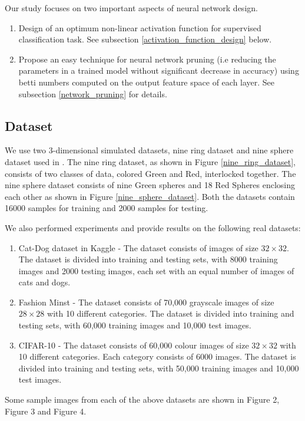 \documentclass{bmvc2k}
\begin{document}
Our study focuses on two important aspects of neural network design.
\begin{enumerate}
\item Design of an optimum non-linear activation function for supervised classification task. See subsection \ref{activation_function_design}  below.
\item Propose an easy technique for neural network pruning (i.e reducing the parameters in a trained model without significant decrease in accuracy) using betti numbers computed on the output feature space of each layer. See subsection \ref{network_pruning} for details.
\end{enumerate}
\subsection{Dataset}
We use two $3$-dimensional simulated datasets, nine ring dataset and nine sphere dataset used in \cite{naitzat2020topology}. The  nine ring dataset, as shown in Figure \ref{nine_ring_dataset},  consists of two classes of data,  colored Green and Red, interlocked together. The nine sphere dataset consists of nine Green spheres and 18 Red Spheres enclosing each other as shown in Figure \ref{nine_sphere_dataset}. Both the datasets contain 16000 samples for training and 2000 samples for testing.

We also performed experiments and provide results on the following real datasets:
\begin{enumerate}
\item Cat-Dog dataset in Kaggle - The dataset consists of  images of size $32 \times 32$. The dataset is divided into training and testing sets, with 8000 training images and 2000 testing images,  each set with an equal number of images of cats and dogs.
\item Fashion Minst - The dataset consists of 70,000 grayscale images of size $28 \times 28$ with 10 different categories. The dataset is divided into training and testing sets, with 60,000 training images and 10,000 test images.
\item CIFAR-10 - The dataset consists of 60,000 colour images of size $32 \times 32$ with 10 different categories. Each category consists of 6000 images. The dataset is divided into training and testing sets, with 50,000 training images and 10,000 test images.
\end{enumerate}

Some sample images from each of the above datasets are shown in Figure 2, Figure 3 and Figure 4.
\end{document}

